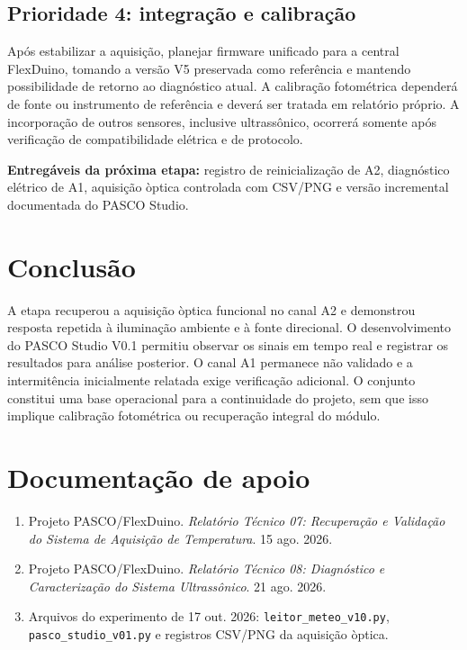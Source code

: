 \documentclass[10pt,a4paper,twocolumn]{article}
\begin{document}
\subsection{Prioridade 4: integra\c{c}\~ao e calibra\c{c}\~ao}
Ap\'os estabilizar a aquisi\c{c}\~ao, planejar firmware unificado para a central FlexDuino, tomando a vers\~ao V5 preservada como refer\^encia e mantendo possibilidade de retorno ao diagn\'ostico atual. A calibra\c{c}\~ao fotom\'etrica depender\'a de fonte ou instrumento de refer\^encia e dever\'a ser tratada em relat\'orio pr\'oprio. A incorpora\c{c}\~ao de outros sensores, inclusive ultrass\^onico, ocorrer\'a somente ap\'os verifica\c{c}\~ao de compatibilidade el\'etrica e de protocolo.

\noindent\textbf{Entreg\'aveis da pr\'oxima etapa:} registro de reinicializa\c{c}\~ao de A2, diagn\'ostico el\'etrico de A1, aquisi\c{c}\~ao \`optica controlada com CSV/PNG e vers\~ao incremental documentada do PASCO Studio.

\section{Conclus\~ao}
A etapa recuperou a aquisi\c{c}\~ao \`optica funcional no canal A2 e demonstrou resposta repetida \`a ilumina\c{c}\~ao ambiente e \`a fonte direcional. O desenvolvimento do PASCO Studio V0.1 permitiu observar os sinais em tempo real e registrar os resultados para an\'alise posterior. O canal A1 permanece n\~ao validado e a intermit\^encia inicialmente relatada exige verifica\c{c}\~ao adicional. O conjunto constitui uma base operacional para a continuidade do projeto, sem que isso implique calibra\c{c}\~ao fotom\'etrica ou recupera\c{c}\~ao integral do m\'odulo.

\section*{Documenta\c{c}\~ao de apoio}
\begin{enumerate}
\item Projeto PASCO/FlexDuino. \emph{Relat\'orio T\'ecnico 07: Recupera\c{c}\~ao e Valida\c{c}\~ao do Sistema de Aquisi\c{c}\~ao de Temperatura}. 15 ago. 2026.
\item Projeto PASCO/FlexDuino. \emph{Relat\'orio T\'ecnico 08: Diagn\'ostico e Caracteriza\c{c}\~ao do Sistema Ultrass\^onico}. 21 ago. 2026.
\item Arquivos do experimento de 17 out. 2026: \texttt{leitor\_meteo\_v10.py}, \texttt{pasco\_studio\_v01.py} e registros CSV/PNG da aquisi\c{c}\~ao \`optica.
\end{enumerate}
\end{document}
